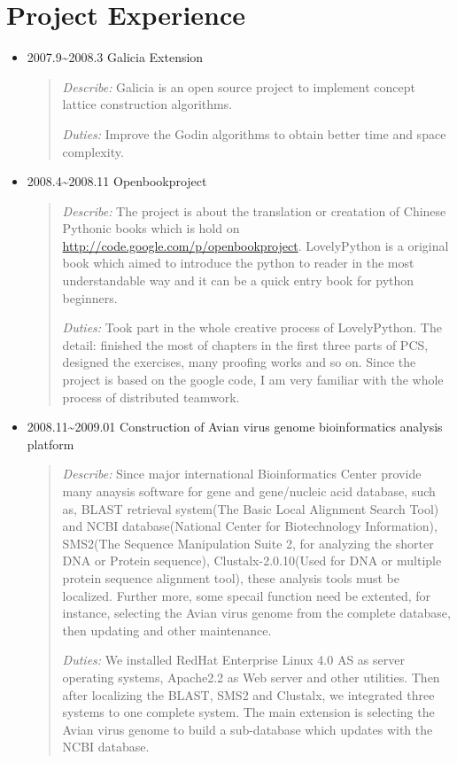 \documentclass[a4paper,10pt,english]{manual}
\begin{document}
\section{Project Experience}
\begin{itemize}

\item {} 
2007.9\textasciitilde{}2008.3 Galicia Extension
\begin{quote}

\emph{Describe:} Galicia is an open source project to implement concept lattice construction algorithms.

\emph{Duties:} Improve the Godin algorithms to obtain better time and space complexity.
\end{quote}

\item {} 
2008.4\textasciitilde{}2008.11 Openbookproject
\begin{quote}

\emph{Describe:} The project is about the translation or creatation of Chinese Pythonic books which is hold on \href{http://code.google.com/p/openbookproject/}{http://code.google.com/p/openbookproject}. LovelyPython is a original book which aimed to introduce the python to reader in the most understandable way and it can be a quick entry book for python beginners.

\emph{Duties:} Took part in the whole creative process of LovelyPython. The detail: finished the most of chapters in the first three parts of PCS,  designed the exercises, many proofing works and so on. Since the project is based on the google code, I am very familiar with the whole process of distributed teamwork.
\end{quote}

\item {} 
2008.11\textasciitilde{}2009.01 Construction of Avian virus genome bioinformatics analysis platform
\begin{quote}

\emph{Describe:} Since major international Bioinformatics Center provide many anaysis software for gene and gene/nucleic acid database, such as, BLAST retrieval system(The Basic Local Alignment Search Tool) and NCBI database(National Center for Biotechnology Information), SMS2(The Sequence Manipulation Suite 2, for analyzing the shorter DNA or Protein sequence), Clustalx-2.0.10(Used for DNA or multiple protein sequence alignment tool), these analysis tools must be localized. Further more, some specail function need be extented, for instance, selecting the Avian virus genome from the complete database, then updating and other maintenance.

\emph{Duties:} We installed RedHat Enterprise Linux 4.0 AS as server operating systems, Apache2.2 as Web server and other utilities. Then after localizing the BLAST, SMS2 and Clustalx, we integrated three systems to one complete system. The main extension is selecting the Avian virus genome to build a sub-database which updates with the NCBI database.
\end{quote}

\end{itemize}
\end{document}
